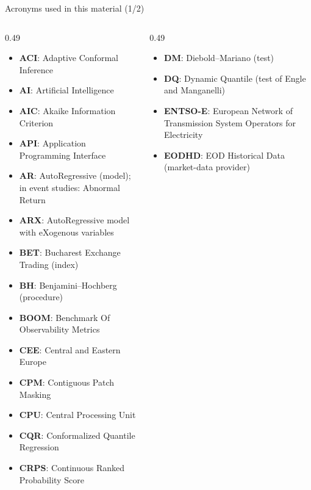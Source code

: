 {
\begin{frame}[noframenumbering]
    \titlepage
\end{frame}
}
\begin{frame}{Acronyms used in this material (1/2)}
\begin{columns}[T]
\begin{column}{0.49\textwidth}
\begin{itemize}\setlength{\itemsep}{0pt}
    \item \textbf{ACI}: Adaptive Conformal Inference
    \item \textbf{AI}: Artificial Intelligence
    \item \textbf{AIC}: Akaike Information Criterion
    \item \textbf{API}: Application Programming Interface
    \item \textbf{AR}: AutoRegressive (model); in event studies: Abnormal Return
    \item \textbf{ARX}: AutoRegressive model with eXogenous variables
    \item \textbf{BET}: Bucharest Exchange Trading (index)
    \item \textbf{BH}: Benjamini–Hochberg (procedure)
    \item \textbf{BOOM}: Benchmark Of Observability Metrics
    \item \textbf{CEE}: Central and Eastern Europe
    \item \textbf{CPM}: Contiguous Patch Masking
    \item \textbf{CPU}: Central Processing Unit
    \item \textbf{CQR}: Conformalized Quantile Regression
    \item \textbf{CRPS}: Continuous Ranked Probability Score
\end{itemize}
\end{column}
\begin{column}{0.49\textwidth}
\begin{itemize}\setlength{\itemsep}{0pt}
    \item \textbf{DM}: Diebold–Mariano (test)
    \item \textbf{DQ}: Dynamic Quantile (test of Engle and Manganelli)
    \item \textbf{ENTSO-E}: European Network of Transmission System Operators for Electricity
    \item \textbf{EODHD}: EOD Historical Data (market-data provider)

\end{itemize}
\end{column}
\end{columns}
\end{frame}
